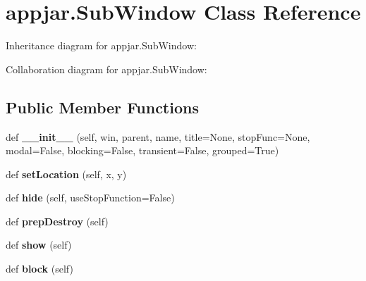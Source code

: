 \hypertarget{classappjar_1_1_sub_window}{}\section{appjar.\+Sub\+Window Class Reference}
\label{classappjar_1_1_sub_window}


Inheritance diagram for appjar.\+Sub\+Window\+:


Collaboration diagram for appjar.\+Sub\+Window\+:
\subsection*{Public Member Functions}
\begin{DoxyCompactItemize}
\item 
\mbox{\label{classappjar_1_1_sub_window_a724612fdf7961ccd1932bdd6e4511e5d}} 
def {\bfseries \+\_\+\+\_\+init\+\_\+\+\_\+} (self, win, parent, name, title=None, stop\+Func=None, modal=False, blocking=False, transient=False, grouped=True)
\item 
\mbox{\label{classappjar_1_1_sub_window_ae04302c58eab73daa5e1d3ab5110fffa}} 
def {\bfseries set\+Location} (self, x, y)
\item 
\mbox{\label{classappjar_1_1_sub_window_ae026383542d35f9dee24a6ce4c114c28}} 
def {\bfseries hide} (self, use\+Stop\+Function=False)
\item 
\mbox{\label{classappjar_1_1_sub_window_a4120f7a92021e55889c5a0ec1d85dbef}} 
def {\bfseries prep\+Destroy} (self)
\item 
\mbox{\label{classappjar_1_1_sub_window_af9c9726bc46fcad74cf6b65623a006af}} 
def {\bfseries show} (self)
\item 
\mbox{\label{classappjar_1_1_sub_window_a1635171c662c0965f98bc8ddba6f5fc3}} 
def {\bfseries block} (self)
\end{DoxyCompactItemize}
